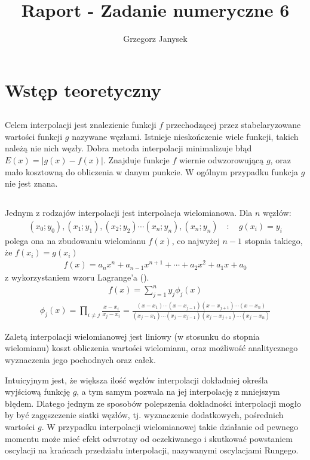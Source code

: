 \documentclass[11pt]{extarticle}
\author{Grzegorz Janysek}
\title{Raport - Zadanie numeryczne 6}
\begin{document}
	\maketitle

	\section{Wstęp teoretyczny}

	\subsection{}
	Celem interpolacji jest znalezienie funkcji \(f\) przechodzącej przez stabelaryzowane wartości funkcji \(g\) nazywane węzłami.
	Istnieje nieskończenie wiele funkcji, takich należą nie nich węzły.
	Dobra metoda interpolacji minimalizuje błąd \(E(x)=|g(x)-f(x)|\).
	Znajduje funkcje \(f\) wiernie odwzorowującą \(g\), oraz mało kosztowną do obliczenia w danym punkcie.
	W ogólnym przypadku funkcja \(g\) nie jest znana.

	\subsection{}
	Jednym z rodzajów interpolacji jest interpolacja wielomianowa. Dla \(n\) węzłów:
	\begin{align}
		(x_0; y_0), (x_1; y_1), (x_2; y_2) \dotsm (x_n; y_n), (x_{n}; y_{n}) \quad : \quad g(x_i) = y_i
	\end{align}
	polega ona na zbudowaniu wielomianu \(f(x)\), co najwyżej \(n-1\) stopnia takiego, że \(f(x_i) = g(x_i)\)
	\begin{align}
		f(x) = a_n x^n + a_{n-1} x^{n+1} + \dotsm + a_2 x^2 + a_1 x + a_0
	\end{align}
	z wykorzystaniem wzoru Lagrange'a ().
	\begin{align}
		f(x) = \sum_{j=1}^n y_j \phi_j(x)
		\label{lag}
	\end{align}
	\begin{align}
		\phi_j(x) = \prod_{i \neq j} \frac{x-x_i}{x_j-x_i} = \frac
			{(x-x_1) \dotsm (x-x_{j-1})(x-x_{j+1}) \dotsm (x-x_n)}
			{(x_j-x_1) \dotsm (x_j-x_{j-1})(x_j-x_{j+1}) \dotsm (x_j-x_n)}
	\end{align}

	Zaletą interpolacji wielomianowej jest liniowy (w stosunku do stopnia wielomianu) koszt obliczenia wartości wielomianu, oraz możliwość analitycznego wyznaczenia jego pochodnych oraz całek.

	Intuicyjnym jest, że większa ilość węzłów interpolacji dokładniej określa wyjściową funkcję \(g\), a tym samym pozwala na jej interpolację z mniejszym błędem.
	Dlatego jednym ze sposobów polepszenia dokładności interpolacji mogło by być zagęszczenie siatki węzłów, tj. wyznaczenie dodatkowych, pośrednich wartości \(g\).
	W przypadku interpolacji wielomianowej takie działanie od pewnego momentu może mieć efekt odwrotny od oczekiwanego i skutkować powstaniem oscylacji na krańcach przedziału interpolacji, nazywanymi oscylacjami Rungego.
\end{document}
